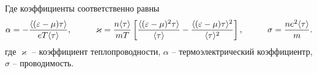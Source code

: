 Где коэффициенты соответственно равны
\begin{equation}
	\alpha = - \frac{\langle (\varepsilon-\mu) \tau \rangle}{e T \langle \tau\rangle},
	\hspace{10 mm} 
	\varkappa = \frac{n \langle \tau\rangle}{m T}\left[
		\frac{\langle (\varepsilon-\mu)^2 \tau\rangle}{\langle \tau\rangle} - \frac{\langle (\varepsilon-\mu) \tau\rangle^2}{\langle \tau\rangle^2}
	\right],
	\hspace{10 mm} 
	\sigma = \frac{n e^2 \langle \tau\rangle}{m}.
\end{equation}
где $\varkappa$ -- коэффициент теплопроводности, $\alpha$ -- термоэлектрический коэффициентр, $\sigma$ -- проводимость. 


